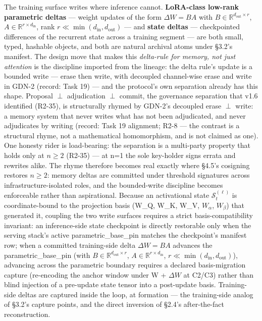 \documentclass[11pt]{article}
\begin{document}
The training surface writes where inference cannot. \textbf{LoRA-class low-rank parametric deltas} --- weight updates of the form \(\Delta W = BA\) with \(B \in \mathbb{R}^{d_{\text{out}}\times r}\), \(A \in \mathbb{R}^{r\times d_{\text{in}}}\), rank \(r \ll \min(d_{\text{in}}, d_{\text{out}})\) --- and \textbf{state deltas} --- checkpointed differences of the recurrent state across a training segment --- are both small, typed, hashable objects, and both are natural archival atoms under \S{}3.2's manifest. The design move that makes this \emph{delta-rule for memory, not just attention} is the discipline imported from the lineage: the delta rule's update is a bounded write --- erase then write, with decoupled channel-wise erase and write in GDN-2 (record: Task 19) --- and the protocol's own separation already has this shape. Proposal \(\perp\) adjudication \(\perp\) commit, the governance separation that v1.6 identified (R2-35), is structurally rhymed by GDN-2's decoupled erase \(\perp\) write: a memory system that never writes what has not been adjudicated, and never adjudicates by writing (record: Task 19 alignment; R2-8 --- the contrast is a structural rhyme, not a mathematical homomorphism, and is not claimed as one). One honesty rider is load-bearing: the separation is a multi-party property that holds only at \(n\geq 2\) (R2-35) --- at n=1 the sole key-holder signs errata and rewrites alike. The rhyme therefore becomes real exactly where \S{}4.5's cosigning restores \(n\geq 2\): memory deltas are committed under threshold signatures across infrastructure-isolated roles, and the bounded-write discipline becomes enforceable rather than aspirational. Because an activational state \(\mathcal{S}_t^{(\ell)}\) is coordinate-bound to the projection basis (W\_Q, W\_K, W\_V, \(W_{\alpha}\), \(W_{\beta}\)) that generated it, coupling the two write surfaces requires a strict basis-compatibility invariant: an inference-side state checkpoint is directly restorable only when the serving stack's active parametric\_base\_pin matches the checkpoint's manifest row; when a committed training-side delta \(\Delta W = BA\) advances the parametric\_base\_pin (with \(B \in \mathbb{R}^{d_{\text{out}}\times r}\), \(A \in \mathbb{R}^{r\times d_{\text{in}}}\), \(r \ll \min(d_{\text{in}}, d_{\text{out}})\)), advancing across the parametric boundary requires a declared basis-migration capture (re-encoding the anchor window under W + \(\Delta W\) at C2/C3) rather than blind injection of a pre-update state tensor into a post-update basis. Training-side deltas are captured inside the loop, at formation --- the training-side analog of \S{}3.2's capture points, and the direct inversion of \S{}2.4's after-the-fact reconstruction.
\end{document}
